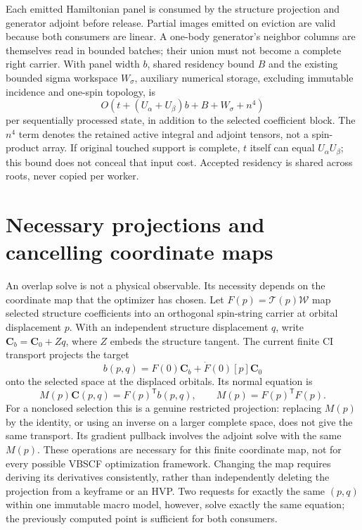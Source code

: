 \documentclass[11pt,a4paper]{article}
\newcommand{\Tr}{^{\mathsf T}}
\newcommand{\Wa}{\mathcal W}
\newcommand{\Ta}{\mathcal T}
\renewcommand{\vv}[1]{\mathbf{#1}}
\begin{document}
Each emitted Hamiltonian panel is consumed by the structure projection and
generator adjoint before release. Partial images emitted on eviction are
valid because both consumers are linear. A one-body generator's neighbor
columns are themselves read in bounded batches; their union must not become
a complete right carrier. With panel width $b$, shared residency bound $B$
and the existing bounded sigma workspace $W_\sigma$, auxiliary numerical
storage, excluding immutable incidence and one-spin topology, is
\begin{equation}
 O\left(t+(U_\alpha+U_\beta)b+B+W_\sigma+n^4\right)
\end{equation}
per sequentially processed state, in addition to the selected coefficient
block. The $n^4$ term denotes the retained active integral and adjoint tensors,
not a spin-product array. If original touched support is complete, $t$
itself can equal $U_\alpha U_\beta$; this bound does not conceal that input
cost. Accepted residency is shared across roots, never copied per worker.

\section{Necessary projections and cancelling coordinate maps}
\label{sec:necessary-maps}

An overlap solve is not a physical observable. Its necessity depends on
the coordinate map that the optimizer has chosen. Let
$F(p)=\Ta(p)\Wa$ map selected structure coefficients into an orthogonal
spin-string carrier at orbital displacement $p$. With an independent
structure displacement $q$, write $\vv C_b=\vv C_0+Zq$, where $Z$ embeds
the structure tangent. The current finite CI transport projects the target
\begin{equation}
 b(p,q)=F(0)\vv C_b+\dot F(0)[p]\vv C_0
\end{equation}
onto the selected space at the displaced orbitals. Its normal equation is
\begin{equation}\label{eq:transport-normal}
 M(p)\vv C(p,q)=F(p)\Tr b(p,q),\qquad M(p)=F(p)\Tr F(p).
\end{equation}
For a nonclosed selection this is a genuine restricted projection: replacing
$M(p)$ by the identity, or using an inverse on a larger complete space,
does not give the same transport. Its gradient pullback involves the adjoint
solve with the same $M(p)$. These operations are necessary for this finite
coordinate map, not for every possible VBSCF optimization framework.
Changing the map requires deriving its derivatives consistently, rather
than independently deleting the projection from a keyframe or an HVP.
Two requests for exactly the same $(p,q)$ within one immutable macro model,
however, solve exactly the same equation; the previously computed point is
sufficient for both consumers.
\end{document}
